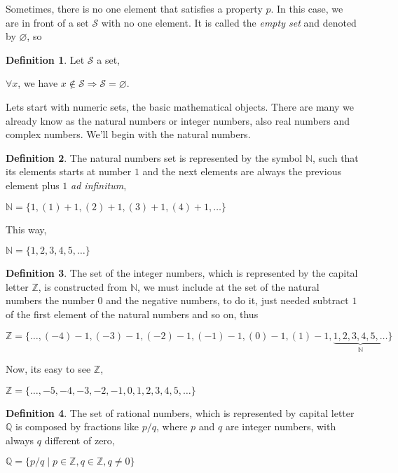 \documentclass[11pt, a4paper]{amsart}
\numberwithin{equation}{section}
\theoremstyle{plain} %
\theoremstyle{definition}
\newtheorem{defn}{Definition}[section]
\theoremstyle{remark}
\begin{document}
Sometimes, there is no one element that satisfies a property $p$. In this case, we are in front of a set $\mathcal{S}$ with no one element. It is called the \textit{empty set} and denoted by $\varnothing$, so

\begin{defn}
Let $\mathcal{S}$ a set,
\begin{center}
    $\forall x$, we have $x \notin \mathcal{S}\Rightarrow \mathcal{S}=\varnothing$.
\end{center}
\end{defn}

Lets start with numeric sets, the basic mathematical objects. There are many we already know as the natural numbers or integer numbers, also real numbers and complex numbers. We'll begin with the natural numbers.

\begin{defn}
    The natural numbers set is represented by the symbol $\mathbb{N}$, such that its elements starts at number $1$ and the next elements are always the previous element plus $1$ \textit{ad infinitum},
    \begin{center}
        $\mathbb{N}=\lbrace1,(1)+1,(2)+1,(3)+1,(4)+1,\dots\rbrace$
    \end{center}
    This way,
    \begin{center}
        $\mathbb{N}=\lbrace1,2,3,4,5,\dots\rbrace$
    \end{center}
\end{defn}
\begin{defn}
The set of the integer numbers, which is represented by the capital letter $\mathbb{Z}$, is constructed from $\mathbb{N}$, we must include at the set of the natural numbers the number $0$ and the negative numbers, to do it, just needed subtract $1$ of the first element of the natural numbers and so on, thus
\begin{center}
    $\mathbb{Z}=\lbrace\dots,(-4)-1, (-3)-1, (-2)-1, (-1)-1, (0)-1, (1)-1, \underbrace{1, 2, 3, 4, 5, \dots}_{\mathbb{N}}\rbrace$
\end{center}

Now, its easy to see $\mathbb{Z}$,

\begin{center}
    $\mathbb{Z}=\lbrace\dots, -5, -4, -3, -2, -1, 0, 1, 2, 3, 4, 5, \dots\rbrace$
\end{center}
\end{defn}

\begin{defn}
The set of rational numbers, which is represented by capital letter $\mathbb{Q}$ is composed by fractions like $p/q$, where $p$ and $q$ are integer numbers, with always $q$ different of zero,
\begin{center}
    $\mathbb{Q}=\lbrace p/q\mid p\in\mathbb{Z}, q\in \mathbb{Z}, q\neq0\rbrace$ 
\end{center}
\end{defn}
\end{document}
